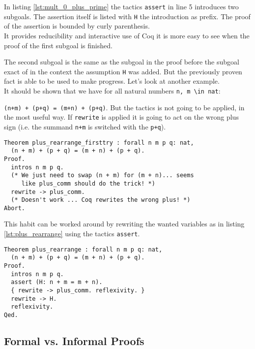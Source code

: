 In listing \ref{lst:mult_0_plus_prime} the tactics \lstinline!assert! in line 5 introduces two subgoals. 
The assertion itself is listed with \lstinline!H! the introduction as prefix.
The proof of the assertion is bounded by curly parenthesis.\\
It provides reducibility and interactive use of Coq it is more easy to see when the proof of the first subgoal is finished.

The second subgoal is the same as the subgoal in the proof before the subgoal exact of in the context the assumption \lstinline!H! was added.
But the previously proven fact is able to be used to make progress.
Let's look at another example.\\
 
It should be shown that we have for all natural numbers \lstinline!n, m \in nat!:
 
\lstinline!(n+m) + (p+q) = (m+n) + (p+q)!.
But the tactics is not going to be applied, in the most useful way. 
If \lstinline!rewrite! is applied it is going to act on the wrong plus sign (i.e. the summand \lstinline!n+m! is switched with the \lstinline!p+q!).
\begin{lstlisting}[caption = \lstinline!plus_rearrange_firstttry!, label=lst:plus_rearrange_firsttry]
Theorem plus_rearrange_firsttry : forall n m p q: nat,
  (n + m) + (p + q) = (m + n) + (p + q).
Proof.
  intros n m p q.
  (* We just need to swap (n + m) for (m + n)... seems
     like plus_comm should do the trick! *)
  rewrite -> plus_comm.
  (* Doesn't work ... Coq rewrites the wrong plus! *)
Abort.
\end{lstlisting}

This habit can be worked around by rewriting the wanted variables as in listing \ref{lst:plus_rearrange} using the tactics \lstinline!assert!. 

\begin{lstlisting}[caption = \lstinline!plus_rearrange!, label = lst:plus_rearrange]
Theorem plus_rearrange : forall n m p q: nat,
  (n + m) + (p + q) = (m + n) + (p + q).
Proof.
  intros n m p q.
  assert (H: n + m = m + n).
  { rewrite -> plus_comm. reflexivity. }
  rewrite -> H. 
  reflexivity.  
Qed.
\end{lstlisting}


\subsection{Formal vs. Informal Proofs}

